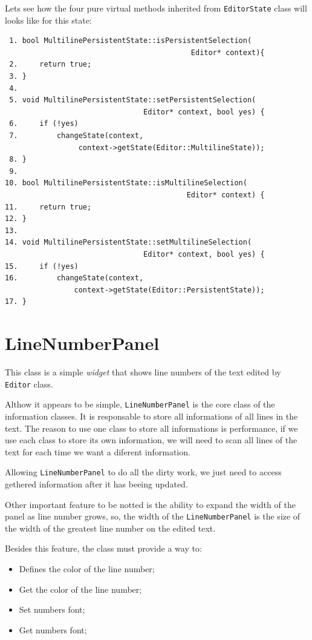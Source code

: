 \documentclass[11pt,a4paper]{report}
\begin{document}
Lets see how the four pure virtual methods inherited from \texttt{EditorState} class will looks like for this state:

\begin{verbatim}
 1. bool MultilinePersistentState::isPersistentSelection(
                                           Editor* context){
 2.     return true;
 3. }
 4.
 5. void MultilinePersistentState::setPersistentSelection(
                                Editor* context, bool yes) {
 6.     if (!yes)
 7.         changeState(context, 
                 context->getState(Editor::MultilineState));
 8. }
 9.
10. bool MultilinePersistentState::isMultilineSelection(
                                          Editor* context) {
11.     return true;
12. }
13.
14. void MultilinePersistentState::setMultilineSelection(
                                Editor* context, bool yes) {
15.     if (!yes)
16.         changeState(context, 
                context->getState(Editor::PersistentState));
17. }
\end{verbatim}

\section{LineNumberPanel} \label{linenumbersection}
This class is a simple \textit{widget} that shows line numbers of the text edited by \texttt{Editor} class.

Althow it appears to be simple, \texttt{LineNumberPanel} is the core class of the information classes. It is responsable to store all informations of all lines in the text. The reason to use one class to store all informations is performance, if we use each class to store its own information, we will need to scan all lines of the text for each time we want a diferent information.

Allowing \texttt{LineNumberPanel} to do all the dirty work, we just need to access gethered information after it has beeing updated. 

Other important feature to be notted is the ability to expand the width of the panel as line number grows, so, the width of the \texttt{LineNumberPanel} is the size of the width of the greatest line number on the edited text.

Besides this feature, the class must provide a way to:

\begin{itemize}
\item Defines the color of the line number;
\item Get the color of the line number;
\item Set numbers font;
\item Get numbers font;
\end{itemize}
\end{document}
